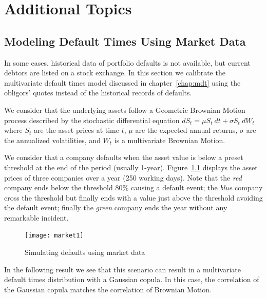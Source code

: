 \documentclass[11pt,fleqn]{book} %
\begin{document}
\chapter{Additional Topics}

\section{Modeling Default Times Using Market Data}

In some cases, historical data of portfolio defaults is not available, but 
current debtors are listed on a stock exchange. In this section we calibrate 
the multivariate default times model discussed in chapter~\ref{chap:mdt} using 
the obligors' quotes instead of the historical records of defaults.

We consider that the underlying assets follow a Geometric Brownian Motion 
process described by the stochastic differential equation 
$dS_t = \mu S_t\ dt + \sigma S_t\ dW_t$
where $S_t$ are the asset prices at time $t$, $\mu$ are the expected annual 
returns, $\sigma$ are the annualized volatilities, and $W_t$ is a multivariate
Brownian Motion.

We consider that a company defaults when the asset value is below a preset 
threshold at the end of the period (usually 1-year). Figure~\ref{fig:market1} 
displays the asset prices of three companies over a year (250 working days). 
Note that the \emph{red} company ends below the threshold $80\%$ causing a 
default event; the \emph{blue} company cross the threshold but finally ends 
with a value just above the threshold avoiding the default event; finally the 
\emph{green} company ends the year without any remarkable incident.

\begin{figure}[!ht]
	\centering
	\texttt{[image: market1]}
	\caption{Simulating defaults using market data}
	\label{fig:market1}
\end{figure}

In the following result we see that this scenario can result in a multivariate 
default times distribution with a Gaussian copula. In this case, the correlation 
of the Gaussian copula matches the correlation of Brownian Motion.
\end{document}
